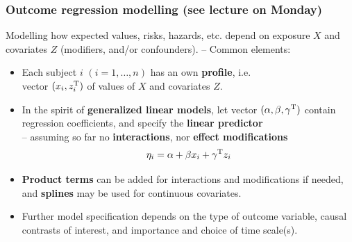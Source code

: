 \documentclass[12pt,dvipsnames,t,aspectratio=169, handout%
]{beamer}
\begin{document}
\begin{frame}
\frametitle{\large Outcome regression modelling (see lecture on Monday)}

Modelling how expected values, risks, hazards, etc. depend on %
exposure $X$ and covariates $Z$ (modifiers, and/or confounders). 
\pause 
-- Common elements:
 \begin{itemize} 
 \item
Each subject $i$ $(i=1, \dots, n)$ has an own {\bf profile}, i.e. \\
vector $(x_{i}, z_i^{\small\text{T}})$ of values of $X$ and covariates $Z$.   
\pause
\medskip
\item
 In the spirit of \textbf{generalized linear models}, let vector  
  $(\alpha, \beta, \gamma^{\small\text{T}})$ contain regression coefficients,
  and specify the \textbf{linear predictor} \\
	-- assuming so far no {\bf interactions}, nor {\bf effect modifications} 
 $$ \eta_i = \alpha + \beta x_i + \gamma^{\small\text{T}}z_i$$
\pause
\item
{\bf Product terms} can be added for interactions and modifications if needed, 
and {\bf splines} may be used for continuous covariates.
\medskip
\item
Further model specification depends on the type of outcome variable, 
causal contrasts of interest, and importance and choice of time scale(s).  
\end{itemize} 
\end{frame}
\end{document}
